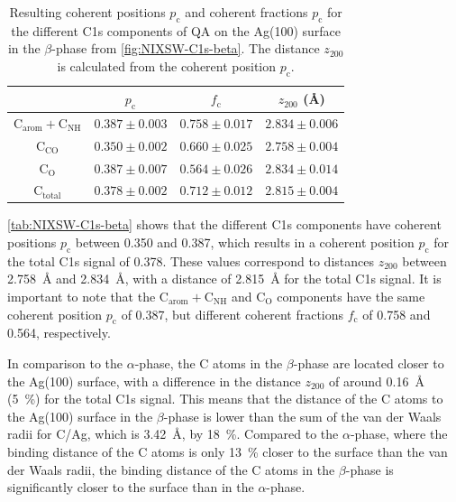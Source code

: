 \begin{table}[htbp]
	\centering
	\caption{Resulting coherent positions $p_\mathrm{c}$ and coherent fractions $p_\mathrm{c}$ for the different C1s components of \ac{QA} on the Ag(100) surface in the $\beta$-phase from \autoref{fig:NIXSW-C1s-beta}. The distance $z_{200}$ is calculated from the coherent position $p_\mathrm{c}$.}
	\begin{tabular}{@{}cccc@{}} \toprule
		 & $p_\mathrm{c}$ & $f_\mathrm{c}$ & $z_{200}$ (\si{\angstrom}) \\
		\midrule
		$\mathrm{C_{arom}}+\mathrm{C_{NH}}$ & $0.387 \pm 0.003$ & $0.758 \pm 0.017$ &  $2.834 \pm 0.006$ \\
		$\mathrm{C_{CO}}$ & $0.350 \pm 0.002$ & $0.660 \pm 0.025$ & $2.758 \pm 0.004$ \\ 
		$\mathrm{C_{O}}$ & $0.387 \pm 0.007$ & $0.564 \pm 0.026$ & $2.834 \pm 0.014$ \\
        $\mathrm{C_{total}}$ & $0.378 \pm 0.002$ & $0.712 \pm 0.012$ & $2.815 \pm 0.004$ \\
		\bottomrule
	\end{tabular}
	\label{tab:NIXSW-C1s-beta}
\end{table}

\autoref{tab:NIXSW-C1s-beta} shows that the different C1s components have coherent positions $p_\mathrm{c}$ between 0.350 and 0.387, which results in a coherent position $p_\mathrm{c}$ for the total C1s signal of 0.378. These values correspond to distances $z_{200}$ between 2.758~\si{\angstrom} and 2.834~\si{\angstrom}, with a distance of 2.815~\si{\angstrom} for the total C1s signal. It is important to note that the $\mathrm{C_{arom}}+\mathrm{C_{NH}}$ and $\mathrm{C_{O}}$ components have the same coherent position $p_\mathrm{c}$ of 0.387, but different coherent fractions $f_\mathrm{c}$ of 0.758 and 0.564, respectively.

In comparison to the $\alpha$-phase, the C atoms in the $\beta$-phase are located closer to the Ag(100) surface, with a difference in the distance $z_{200}$ of around 0.16~\si{\angstrom} (5~\%) for the total C1s signal. This means that the distance of the C atoms to the Ag(100) surface in the $\beta$-phase is lower than the sum of the van der Waals radii for C/Ag, which is 3.42~\si{\angstrom}\autocite{Bondi1964}, by 18~\%. Compared to the $\alpha$-phase, where the binding distance of the C atoms is only 13~\% closer to the surface than the van der Waals radii, the binding distance of the C atoms in the $\beta$-phase is significantly closer to the surface than in the $\alpha$-phase.

